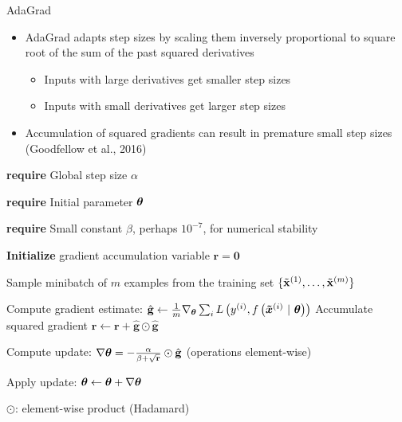 \documentclass[11pt,compress,t,notes=noshow, xcolor=table]{beamer}
\begin{document}
\begin{vbframe}{AdaGrad}
	\begin{itemize}
        \setlength{\itemsep}{1em}
		\item AdaGrad adapts step sizes by
		scaling them inversely proportional to square root of the sum of the past squared derivatives
		\begin{itemize}
            \setlength{\itemsep}{0.5em}
			\item Inputs with large derivatives get smaller step sizes
			\item Inputs with small derivatives get larger step sizes
		\end{itemize}
		\item Accumulation of squared gradients can result in premature small step sizes (Goodfellow et al., 2016)
	\end{itemize}
	
	
	
\begin{algorithm}[H]
    \caption{AdaGrad}
    \begin{algorithmic}[1]
        \small 
        \State \textbf{require} Global step size $\alpha$ \strut
        \State \textbf{require} Initial parameter $\bm{\theta}$ \strut
        \State \textbf{require} Small constant $\beta$, perhaps $10^{-7}$, for numerical stability \strut
        \State \textbf{Initialize} gradient accumulation variable $\mathbf{r} = \mathbf{0} $
        \State \parbox[t]{\dimexpr\linewidth-\algorithmicindent}{Sample minibatch of $m$ examples from the training set $\{\tilde{\mathbf{x}}^{(1)},\dots,\tilde{\mathbf{x}}^{(m)}\}$ \strut}
        \State Compute gradient estimate: $\hat{\mathbf{g}} \leftarrow \frac{1}{m} \nabla_{\bm{\theta}} \sum_{i} L\left(y^{(i)}, f\left(\bm{\tilde{x}}^{(i)} ~|~ \bm{\theta}\right)\right)$
        \State Accumulate squared gradient $\mathbf{r} \leftarrow \mathbf{r} + \hat{\mathbf{g}} \odot  \hat{\mathbf{g}}$
        \State \parbox[t]{\dimexpr\linewidth-\algorithmicindent}{Compute update: $\nabla \bm{\theta} = - \frac{\alpha}{\beta + \sqrt\mathbf{r}} \odot \hat{\mathbf{g}}$ (operations element-wise) \strut}
        \State Apply update: $\bm{\theta} \leftarrow \bm{\theta} + \nabla\bm{\theta}$
        \EndWhile
    \end{algorithmic}
\end{algorithm}

$\odot$: element-wise product (Hadamard)
\end{vbframe}
\end{document}
